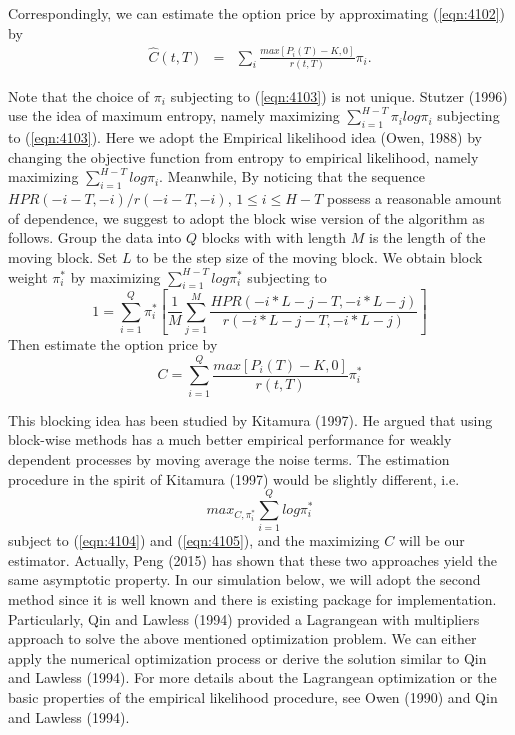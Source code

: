 Correspondingly, we can estimate the option price by approximating (\ref{eqn:4102}) by
\begin{eqnarray}
\hat{C}(t,T)&=& \sum_{i} \frac{max[P_i(T)-K,0]}{r(t,T)}  \pi_i.
\end{eqnarray}

Note that the choice of $\pi_i$ subjecting to (\ref{eqn:4103}) is not unique. Stutzer (1996) use the idea of maximum entropy, namely maximizing $\sum^{H-T}_{i=1}\pi_ilog\pi_i$ subjecting to (\ref{eqn:4103}). Here we adopt the Empirical likelihood idea (Owen, 1988) by changing the objective function from entropy to empirical likelihood, namely maximizing $\sum^{H-T}_{i=1}log\pi_i$. Meanwhile, By noticing that the sequence $HPR(-i-T,-i)/r(-i-T,-i)$, $1\leq i\leq H-T$ possess a reasonable amount of dependence, we suggest to adopt the block wise version of the algorithm as follows. Group the data into $Q$ blocks with with length $M$ is the length of the moving block. Set $L$ to be the step size of the moving block. We obtain block weight $\pi^*_i$ by maximizing $\sum_{i=1}^{H-T} log\pi_i^*$ subjecting to 
\begin{equation}\label{eqn:4104}
1=\sum_{i=1}^{Q} \pi^*_i \left[\frac{1}{M} \sum_{j=1}^M \frac{HPR(-i*L-j-T, -i*L-j)}{r(-i*L-j-T, -i*L-j)}\right]
\end{equation} 
Then estimate the option price by 
\begin{equation}\label{eqn:4105}
C  =  \sum_{i=1}^Q \frac{max[P_i(T)-K,0]}{r(t,T)}  \pi^*_i
\end{equation} 


This blocking idea has been studied by Kitamura (1997). He argued that using block-wise methods has a much better empirical performance for weakly dependent processes by moving average the noise terms. The estimation procedure in the spirit of Kitamura (1997) would be slightly different, i.e. 
\begin{equation}
max_{C, \pi_i^*} \sum_{i=1}^{Q} log\pi_i^*
\end{equation}
subject to (\ref{eqn:4104}) and  (\ref{eqn:4105}), and the maximizing $C$ will be our estimator. Actually, Peng (2015) has shown that these two approaches yield the same asymptotic property. In our simulation below, we will adopt the second method since it is well known and there is existing package for implementation. Particularly, Qin and Lawless (1994) provided a Lagrangean with multipliers approach to solve the above mentioned optimization problem. We can either apply the numerical optimization process or derive the solution similar to Qin and Lawless (1994). For more details about the Lagrangean optimization or the basic properties of the empirical likelihood procedure, see Owen (1990) and Qin and Lawless (1994). 
  


